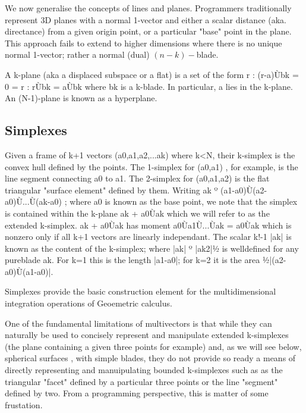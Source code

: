 \documentclass[a4paper]{book}
\numberwithin{equation}{chapter}
\begin{document}
We now generalise the concepts of lines and planes. Programmers traditionally represent 3D 
planes with a normal 1-vector and either a scalar distance (aka. directance) from a given origin 
point, or a particular "base" point in the plane. This approach fails to extend to higher 
dimensions where there is no unique normal 1-vector; rather a normal (dual) $(n-k)-$blade.

\vspace{\baselineskip}

A k-plane (aka a displaced subspace or a flat) is a set of the form { r : (r-a)Ùbk = 0 } =
{ r : rÙbk = aÙbk } where bk is a k-blade. In particular, a lies in the k-plane. An (N-1)-plane
is known as a hyperplane. 

\subsection{Simplexes}

Given a frame of k+1 vectors (a0,a1,a2,...ak) where k<N, their k-simplex is the convex hull defined by the points. The 1-simplex for (a0,a1) , for example, is the line segment connecting a0 to a1. The 2-simplex for (a0,a1,a2) is the flat triangular "surface element" defined by them.
     Writing ak º (a1-a0)Ù(a2-a0)Ù...Ù(ak-a0) ; where a0 is known as the base point, we note that the simplex is contained within the k-plane ak + a0Ùak which we will refer to as the extended k-simplex.
      ak + a0Ùak has moment a0Ùa1Ù...Ùak = a0Ùak which is nonzero only if all k+1 vectors are linearly independant.
    The scalar k!-1 |ak| is known as the content of the k-simplex; where |ak| º |ak2|½ is welldefined for any pureblade ak. For k=1 this is the length |a1-a0|; for k=2 it is the area ½|(a2-a0)Ù(a1-a0)|.

    Simplexes provide the basic construction element for the multidimensional integration operations of Geoemetric calculus.

    One of the fundamental limitations of multivectors is that while they can naturally be used to concisely represent and manipulate extended k-simplexes (the plane containing a given three points for example) and, as we will see below, spherical surfaces , with simple blades, they do not provide so ready a means of directly representing and manuipulating bounded k-simplexes such as as the triangular "facet" defined by a particular three points or the line "segment" defined by two. From a programming perspective, this is matter of some frustation. 
\end{document}

